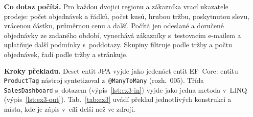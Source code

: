 \textbf{Co dotaz počítá.} Pro každou dvojici regionu a zákazníka vrací ukazatele prodeje: počet objednávek a řádků, počet kusů, hrubou tržbu, poskytnutou slevu, vrácenou částku, průměrnou cenu a další. Počítá jen odeslané a doručené objednávky ze zadaného období, vynechává zákazníky s~testovacím e-mailem a uplatňuje další podmínky s~poddotazy. Skupiny filtruje podle tržby a počtu objednávek, řadí podle tržby a stránkuje.

\textbf{Kroky překladu.} Deset entit JPA vyjde jako jedenáct entit EF~Core: entitu \texttt{ProductTag} nástroj syntetizoval z~\texttt{@ManyToMany} (rozh.~005). Třída \texttt{SalesDashboard} s~dotazem (výpis~\ref{lst:ex3-in}) vyjde jako jedna metoda v~LINQ (výpis~\ref{lst:ex3-out}). Tab.~\ref{tab:ex3} uvádí překlad jednotlivých konstrukcí a místa, kde je zápis v~cíli delší než ve zdroji.

